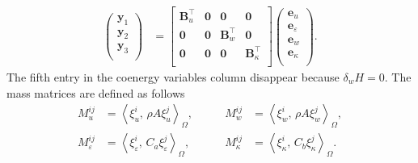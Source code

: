 \documentclass{ifacconf}
\newcommand{\inner}[3][]{\ensuremath{\left\langle #2, \, #3 \right\rangle_{#1}}}
\begin{document}
\begin{equation}
\begin{aligned}
	\begin{pmatrix}
		\mathbf{y}_{1} \\
		\mathbf{y}_2 \\
		\mathbf{y}_3 \\
	\end{pmatrix} &= \begin{bmatrix}
	\mathbf{B}_u^\top & \mathbf{0} & \mathbf{0} & \mathbf{0}\\
	\mathbf{0} & \mathbf{0} & \mathbf{B}_w^\top & \mathbf{0}\\
	\mathbf{0} & \mathbf{0} & \mathbf{0} & \mathbf{B}_{\kappa}^\top \\
	\end{bmatrix} \begin{pmatrix}
	\mathbf{e}_u \\
	\mathbf{e}_\varepsilon \\
	\mathbf{e}_w \\
	\mathbf{e}_\kappa \\
\end{pmatrix}.
	\end{aligned}
\end{equation}
 The fifth entry in the coenergy variables column disappear because $\delta_w H=0$. The mass matrices are defined as follows
\begin{equation}
	\begin{aligned}
	M_u^{ij} &= \inner[\Omega]{\xi_u^i}{\rho A \xi_u^j}, \\
	M_\varepsilon^{ij} &= \inner[\Omega]{\xi_\varepsilon^i}{C_a \xi_\varepsilon^j}, 
	\end{aligned} \qquad 
	\begin{aligned}
	M_w^{ij} &= \inner[\Omega]{\xi_w^i}{\rho A \xi_w^j}, \\
	M_\kappa^{ij} &= \inner[\Omega]{\xi_\kappa^i}{C_b \xi_\kappa^j}.
	\end{aligned}
\end{equation}
\end{document}
